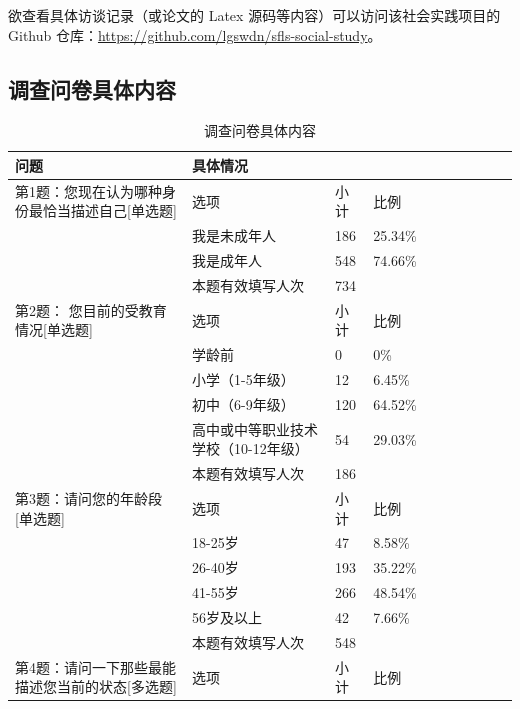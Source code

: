 \documentclass[12pt,UTF8]{ctexart}
\begin{document}
{	欲查看具体访谈记录（或论文的 Latex 源码等内容）可以访问该社会实践项目的 Github 仓库：\url{https://github.com/lgswdn/sfls-social-study}。
}

\subsection{调查问卷具体内容}
{
	\footnotesize
	\begin{spacing}{01}
		\begin{longtable}{p{3.5cm}p{2cm}p{1.5cm}p{1.5cm}p{1.5cm}p{1.5cm}p{1.5cm}p{1cm}}
			\caption{\normalsize 调查问卷具体内容}\\
			\hline
			\hline
			\bf 问题&\bf 具体情况& ~ & ~ & ~ & ~ & ~ & ~ \\
			\hline
			\hline
			第1题：您现在认为哪种身份最恰当描述自己[单选题] & 选项 & 小计 & 比例 & ~ & ~ & ~ & ~ \\ \hline
			~ & 我是未成年人 & 186 & 25.34\% & ~ & ~ & ~ & ~ \\ \hline
			~ & 我是成年人 & 548 & 74.66\% & ~ & ~ & ~ & ~ \\ \hline
			~ & 本题有效填写人次 & 734 & ~ & ~ & ~ & ~ & ~ \\ \hline
			第2题： 您目前的受教育情况[单选题] & 选项 & 小计 & 比例 & ~ & ~ & ~ & ~ \\ \hline
			~ & 学龄前 & 0 & 0\% & ~ & ~ & ~ & ~ \\ \hline
			~ & 小学（1-5年级） & 12 & 6.45\% & ~ & ~ & ~ & ~ \\ \hline
			~ & 初中（6-9年级） & 120 & 64.52\% & ~ & ~ & ~ & ~ \\ \hline
			~ & 高中或中等职业技术学校（10-12年级） & 54 & 29.03\% & ~ & ~ & ~ & ~ \\ \hline
			~ & 本题有效填写人次 & 186 & ~ & ~ & ~ & ~ & ~ \\ \hline
			第3题：请问您的年龄段[单选题] & 选项 & 小计 & 比例 & ~ & ~ & ~ & ~ \\ \hline
			~ & 18-25岁 & 47 & 8.58\% & ~ & ~ & ~ & ~ \\ \hline
			~ & 26-40岁 & 193 & 35.22\% & ~ & ~ & ~ & ~ \\ \hline
			~ & 41-55岁 & 266 & 48.54\% & ~ & ~ & ~ & ~ \\ \hline
			~ & 56岁及以上 & 42 & 7.66\% & ~ & ~ & ~ & ~ \\ \hline
			~ & 本题有效填写人次 & 548 & ~ & ~ & ~ & ~ & ~ \\ \hline
			第4题：请问一下那些最能描述您当前的状态[多选题] & 选项 & 小计 & 比例 & ~ & ~ & ~ & ~ \\ \hline

\end{longtable}
\end{spacing}}
\end{document}

